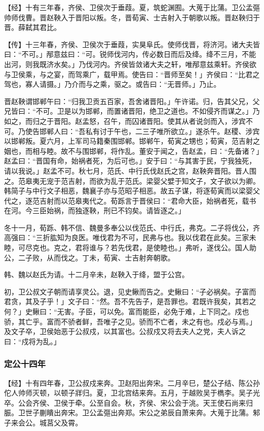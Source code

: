 \documentclass[]{article}
\begin{document}
【经】十有三年春，齐侯、卫侯次于垂葭。夏，筑蛇渊囿。大蒐于比蒲。卫公孟彄帅师伐曹。晋赵鞅入于晋阳以叛。冬，晋荀寅、士吉射入于朝歌以叛。晋赵鞅归于晋。薛弑其君比。

【传】十三年春，齐侯、卫侯次于垂葭，实狊阜氏。使师伐晋，将济河。诸大夫皆曰：``不可。」邴意兹曰：``可。锐师伐河内，传必数日而后及绛。绛不三月，不能出河，则我既济水矣。」乃伐河内。齐侯皆敛诸大夫之轩，唯邴意兹乘轩。齐侯欲与卫侯乘，与之宴，而驾乘广，载甲焉。使告曰：``晋师至矣！」齐侯曰：``比君之驾也，寡人请摄。」乃介而与之乘，驱之。或告曰：``无晋师。」乃止。

晋赵鞅谓邯郸午曰：``归我卫贡五百家，吾舍诸晋阳。」午许诺。归，告其父兄，父兄皆曰：``不可。卫是以为邯郸，而置诸晋阳，绝卫之道也。不如侵齐而谋之。」乃如之，而归之于晋阳。赵孟怒，召午，而囚诸晋阳。使其从者说剑而入，涉宾不可。乃使告邯郸人曰：``吾私有讨于午也，二三子唯所欲立。」遂杀午。赵稷、涉宾以邯郸叛。夏六月，上军司马籍秦围邯郸。邯郸午，荀寅之甥也；荀寅，范吉射之姻也，而相与睦。故不与围邯郸，将作乱。董安于闻之，告赵孟，曰：``先备诸？」赵孟曰：``晋国有命，始祸者死，为后可也。」安于曰：``与其害于民，宁我独死，请以我说。」赵孟不可。秋七月，范氏、中行氏伐赵氏之宫，赵鞅奔晋阳。晋人围之。范皋夷无宠于范吉射，而欲为乱于范氏。梁婴父嬖于知文子，文子欲以为卿。韩简子与中行文子相恶，魏襄子亦与范昭子相恶。故五子谋，将逐荀寅而以梁婴父代之，逐范吉射而以范皋夷代之。荀跞言于晋侯曰：``君命大臣，始祸者死，载书在河。今三臣始祸，而独逐鞅，刑已不钧矣。请皆逐之。」

冬十一月，荀跞、韩不信、魏曼多奉公以伐范氏、中行氏，弗克。二子将伐公，齐高强曰：``三折肱知为良医。唯伐君为不可，民弗与也。我以伐君在此矣。三家未睦，可尽克也。克之，君将谁与？若先伐君，是使睦也。」弗听，遂伐公。国人助公，二子败，从而伐之。丁未，荀寅、士吉射奔朝歌。

韩、魏以赵氏为请。十二月辛未，赵鞅入于绛，盟于公宫。

初，卫公叔文子朝而请享灵公。退，见史鳅而告之。史鳅曰：``子必祸矣。子富而君贪，其及子乎！」文子曰：``然。吾不先告子，是吾罪也。君既许我矣，其若之何？」史鳅曰：``无害。子臣，可以免。富而能臣，必免于难，上下同之。戍也骄，其亡乎。富而不骄者鲜，吾唯子之见。骄而不亡者，未之有也。戍必与焉。」及文子卒，卫侯始恶于公叔戍，以其富也。公叔戍又将去夫人之党，夫人诉之曰：``戍将为乱。」

\hypertarget{header-n3018}{%
\subsubsection{定公十四年}\label{header-n3018}}

【经】十有四年春，卫公叔戍来奔。卫赵阳出奔宋。二月辛巳，楚公子结、陈公孙佗人帅师灭顿，以顿子牂归。夏，卫北宫结来奔。五月，于越败吴于檇李。吴子光卒。公会齐侯、卫侯于牵。公至自会。秋，齐侯、宋公会于洮。天王使石尚来归脤。卫世子蒯瞶出奔宋。卫公孟彄出奔郑。宋公之弟辰自萧来奔。大蒐于比蒲。邾子来会公。城莒父及霄。
\end{document}
